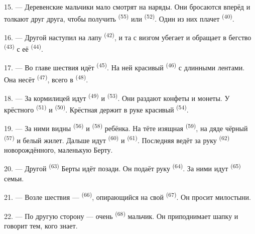 15. --- Деревенские мальчики мало смотрят на наряды. Они бросаются
вперёд и толкают друг друга, чтобы получить 
\textsuperscript{(55)} или  \textsuperscript{(52)}. Один из них плачет
\textsuperscript{(40)}.

16. --- Другой наступил на лапу  \textsuperscript{(42)}, и та с
визгом убегает и обращает в бегство  \textsuperscript{(43)} с её
 \textsuperscript{(44)}.

\VUsaut{5.0mm}
\VUsaut{4.0mm}

17. --- Во главе шествия идёт  \textsuperscript{(45)}. На ней
красивый  \textsuperscript{(46)} с длинными лентами. Она несёт
 \textsuperscript{(47)}, всего в 
\textsuperscript{(48)}.

18. --- За кормилицей идут  \textsuperscript{(49)} и
 \textsuperscript{(53)}. Они раздают конфеты и монеты. У
крёстного  \textsuperscript{(51)} и 
\textsuperscript{(50)}. Крёстная держит в руке красивый 
\textsuperscript{(54)}.

19. --- За ними видны  \textsuperscript{(56)} и 
\textsuperscript{(58)} ребёнка. На тёте изящная  \textsuperscript{(59)},
на дяде чёрный  \textsuperscript{(57)} и белый жилет. Дальше идут
 \textsuperscript{(60)} и 
\textsuperscript{(61)}. Последняя ведёт за руку  \textsuperscript{(62)}
новорождённого, маленькую Берту.

20. --- Другой  \textsuperscript{(63)} Берты идёт позади. Он подаёт
руку  \textsuperscript{(64)}. За ними идут 
\textsuperscript{(65)} семьи.

\VUsaut{4.6mm}
\VUsaut{3.4mm}

21. --- Возле шествия ---  \textsuperscript{(66)}, опирающийся на
свой  \textsuperscript{(67)}. Он просит милостыни.

22. --- По другую сторону --- очень  \textsuperscript{(68)}
мальчик. Он приподнимает шапку и говорит  тем, кого
знает.

